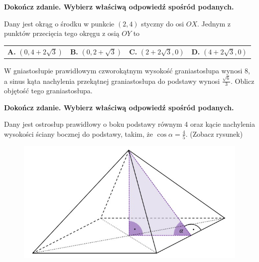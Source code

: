 \documentclass[12pt,a4paper]{article}
\theoremstyle{break}
\begin{document}
	
	\begin{zad}[0-1]
		\textbf{Dokończ zdanie. Wybierz właściwą odpowiedź spośród podanych.}
	\end{zad} 
	
	Dany jest okrąg o środku w punkcie $(2,4)$ styczny do osi $OX$. Jednym z punktów przecięcia tego okręgu z osią $OY$ to
	
	\vspace{0.5cm}
	\begin{tabular}{p{3.5cm} p{3.5cm} p{3.5cm} p{3.5cm}}
		\textbf{A. }$(0,4+2\sqrt{3})$&
		\textbf{B. }$(0,2+\sqrt{3})$&
		\textbf{C. }$(2+2\sqrt{3},0)$&
		\textbf{D. }$(4+2\sqrt{3},0)$\\
	\end{tabular}
	
	\newpage
	
	\begin{zad}[0-3]
		W gniastosłupie prawidłowym czworokątnym wysokość graniastosłupa wynosi 8, a sinus kąta nachylenia przekątnej graniastosłupa do podstawy wynosi $\frac{\sqrt{6}}{3}$. Oblicz objętość tego graniastosłupa.
	\end{zad} 

	
	
	\begin{zad}[0-1]
		\textbf{Dokończ zdanie. Wybierz właściwą odpowiedź spośród podanych.}
	\end{zad} 

	Dany jest ostrosłup prawidłowy o boku podstawy równym 4 oraz kącie nachylenia wysokości ściany bocznej do podstawy, takim, że $\cos\alpha=\frac{4}{5}$. (Zobacz rysunek)
	
	\begin{figure}[h]
		\centering
		\includegraphics[scale=0.8]{pm5.jpeg}
	\end{figure}
\end{document}
